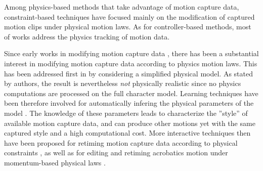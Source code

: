 {{				
				\label{subsubsubsec:CA_MC_Hybrid_MoCap}

Among physics-based methods that take advantage of motion capture data, constraint-based techniques have focused mainly on the modification of captured motion clips under physical motion laws. As for controller-based methods, most of works address the physics tracking of motion data.


					\label{subsubsubsubsec:CA_MC_Hybrid_MoCap_Modif}

Since early works in modifying motion capture data , there has been a substantial interest in modifying motion capture data according to physics motion laws. This has been addressed first in  by considering a simplified physical model. As stated by authors, the result is nevertheless \emph{not} physically realistic since no physics computations are processed on the full character model. Learning techniques have been therefore involved for automatically infering the physical parameters of the model . The knowledge of these parameters leads to characterize the ''style'' of available motion capture data, and can produce other motions yet with the same captured style and a high computational cost. More interactive techniques then have been proposed for retiming motion capture data according to physical constraints , as well as for editing and retiming acrobatics motion under momentum-based physical laws .





					\label{subsubsubsubsec:CA_MC_Hybrid_MoCap_Tracking}

}}
